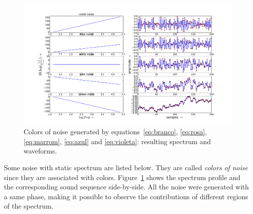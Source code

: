 \documentclass[
 aip,
 jmp,
 amsmath,amssymb,
 reprint,
]{revtex4-1}
\begin{document}
\begin{figure}[htpq!]
     \centering
         \includegraphics[width=\columnwidth]{figures/ruidos}
     \caption{Colors of noise generated by equations~\ref{eq:branco}, \ref{eq:rosa}, \ref{eq:marrom}, \ref{eq:azul} and \ref{eq:violeta}: resulting spectrum and waveforms.}
         \label{fig:ruidos}
\end{figure}

Some noise with static spectrum are listed below. They are called \emph{colors of noise} since they are associated with colors.
Figure~\ref{fig:ruidos} shows the spectrum profile and the corresponding sound sequence side-by-side. All the noise were generated with a same phase, making it possible to observe the contributions of different regions of the spectrum.
\end{document}
